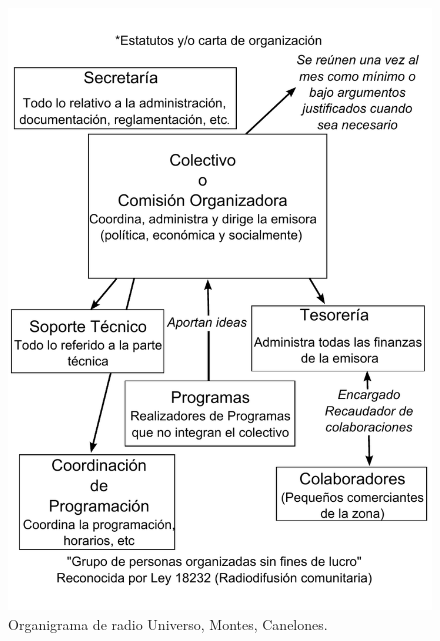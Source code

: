 \begin{figure}[htbp]
 \centering
 \includegraphics[scale=0.7]{./Cap/Organigramas/uni.pdf}
 \caption{Organigrama de radio Universo, Montes, Canelones.}
\end{figure}

